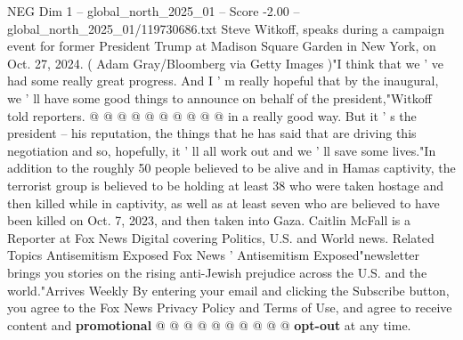 \begin{textsample}{NEG Dim 1 – global\_north\_2025\_01 – Score -2.00 – global\_north\_2025\_01/119730686.txt}
Steve Witkoff, speaks during a campaign event for former President Trump at Madison Square Garden in New York, on Oct. 27, 2024. ( Adam Gray/Bloomberg via Getty Images )"I think that we ' ve had some really great progress.
And I ' m really hopeful that by the inaugural, we ' ll have some good things to announce on behalf of the president,"Witkoff told reporters. @ @ @ @ @ @ @ @ @ @ in a really good way.
But it ' s the president -- his reputation, the things that he has said that are driving this negotiation and so, hopefully, it ' ll all work out and we ' ll save some lives."In addition to the roughly 50 people believed to be alive and in Hamas captivity, the terrorist group is believed to be holding at least 38 who were taken hostage and then killed while in captivity, as well as at least seven who are believed to have been killed on Oct. 7, 2023, and then taken into Gaza.
Caitlin McFall is a Reporter at Fox News Digital covering Politics, U.S. and World news.
Related Topics Antisemitism Exposed Fox News ' Antisemitism Exposed"newsletter brings you stories on the rising anti-Jewish prejudice across the U.S. and the world."Arrives Weekly By entering your email and clicking the Subscribe button, you agree to the Fox News Privacy Policy and Terms of Use, and agree to receive content and \textbf{promotional} @ @ @ @ @ @ @ @ @ @ \textbf{opt-out} at any time.

\end{textsample}
